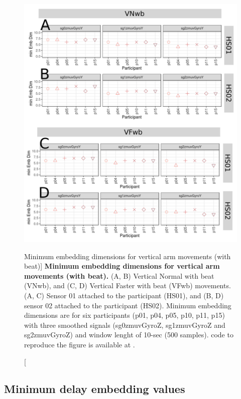 \begin{figure}
\centering
\includegraphics[width=1.0\textwidth]{cao_Vwb_w10}
	\caption
	[Minimum embedding dimensions for vertical arm movements 
	(with beat)]{
	{\bf Minimum embedding dimensions for vertical arm movements 
	(with beat).} 
		(A, B) Vertical Normal with beat (VNwb), and
		(C, D) Vertical Faster with beat (VFwb) movements.
		(A, C) Sensor 01 attached to the participant (HS01), and
		(B, D) sensor 02 attached to the participant (HS02).
		Minimum embedding dimensions are for six participants 
		(p01, p04, p05, p10, p11, p15) with three smoothed signals 
		(sg0zmuvGyroZ, sg1zmuvGyroZ and sg2zmuvGyroZ)
		and window lenght of 10-sec (500 samples).
		\R code to reproduce the figure is available at 
		.
        }
    \label{fig:a:caoVwb}
\end{figure}






\newpage
\subsection{Minimum delay embedding values}

